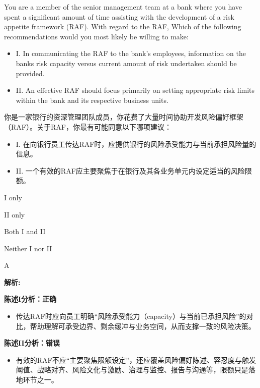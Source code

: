 \documentclass{article}
\newcounter{question} %
\newenvironment{explanation}
{\textbf{解析:}\par}
{\par}
\begin{document}
\begin{question}
    You are a member of the senior management team at a bank where you have spent a significant amount of time assisting with the development of a risk appetite framework (RAF). With regard to the RAF, Which of the following recommendations would you most likely be willing to make:
    \begin{itemize}
        \item I. In communicating the RAF to the bank's employees, information on the banks risk capacity versus current amount of risk undertaken should be provided.
        \item II. An effective RAF should focus primarily on setting appropriate risk limits within the bank and its respective business units.
    \end{itemize}
    你是一家银行的资深管理团队成员，你花费了大量时间协助开发风险偏好框架（RAF）。关于RAF，你最有可能同意以下哪项建议：
    \begin{itemize}
        \item I. 在向银行员工传达RAF时，应提供银行的风险承受能力与当前承担风险量的信息。
        \item II. 一个有效的RAF应主要聚焦于在银行及其各业务单元内设定适当的风险限额。
    \end{itemize}
\end{question}

\begin{choices}
    \item I only
    \item II only
    \item Both I and II
    \item Neither I nor II
\end{choices}

\begin{correctanswer}
    A
\end{correctanswer}

\begin{explanation}
   
        \textbf{陈述I分析：正确}
        \begin{itemize}
            \item 传达RAF时应向员工明确“风险承受能力（capacity）与当前已承担风险”的对比，帮助理解可承受边界、剩余缓冲与业务空间，从而支撑一致的风险决策。
        \end{itemize}
    
        \textbf{陈述II分析：错误}
        \begin{itemize}
            \item 有效的RAF不应“主要聚焦限额设定”，还应覆盖风险偏好陈述、容忍度与触发阈值、战略对齐、风险文化与激励、治理与监控、报告与沟通等，限额只是落地环节之一。
        \end{itemize}
    \end{explanation}
\end{document}
